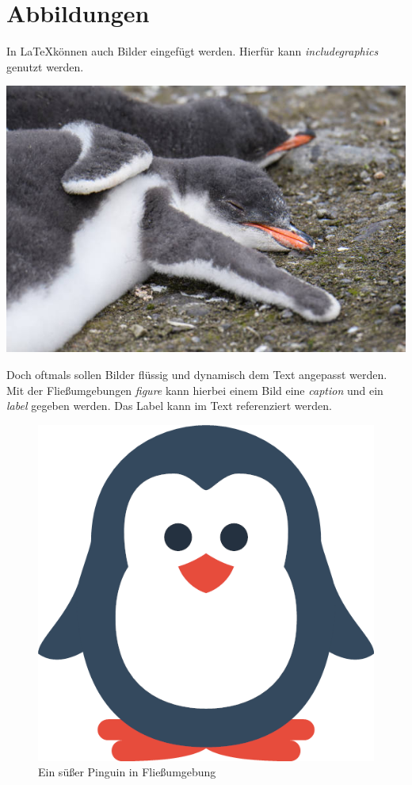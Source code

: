 \section{Abbildungen}
In \LaTeX können auch Bilder eingefügt werden. Hierfür kann \textit{includegraphics} genutzt werden.

\includegraphics[scale=0.8]{bilder/penguin-sleeping.jpg}

Doch oftmals sollen Bilder flüssig und dynamisch dem Text angepasst werden. Mit der Fließumgebungen \textit{figure} kann hierbei einem Bild eine \textit{caption} und ein \textit{label} gegeben werden. Das Label kann im Text referenziert werden.

\begin{figure}
    \includegraphics[scale=0.3]{bilder/penguin.png}
    \caption{Ein süßer Pinguin in Fließumgebung}
    \label{fig.pinguin}
\end{figure}

